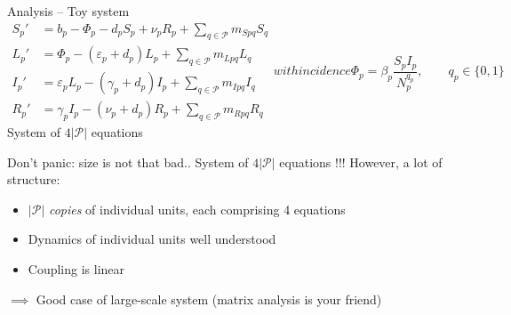 \documentclass[aspectratio=43]{beamer}
\begin{document}
\begin{frame}{Analysis -- Toy system}
\begin{subequations}
	\label{sys:pSLIRS_toy}
	\begin{align}
		S_{p}' &=b_p-\Phi_p-d_pS_p+\nu_pR_p
		+\textstyle{\sum_{q\in\mathcal{P}}} m_{Spq}S_{q} 
		\label{sys:pSLIRS_toy_dS} \\
		L_{p}' &=\Phi_p-\left( \varepsilon_{p}+d_{p}\right)L_{p}
		+\textstyle{\sum_{q\in\mathcal{P}}} m_{Lpq}L_{q} 
		\label{sys:pSLIRS_toy_dL} \\
		I_{p}' &=\varepsilon_pL_p-(\gamma_p+d_p)I_p
		+\textstyle{\sum_{q\in\mathcal{P}}} m_{Ipq}I_{q} 
		\label{sys:pSLIRS_toy_dI} \\
		R_{p}' &=\gamma _{p}I_{p}-\left(\nu_{p}+d_{p}\right)R_{p}
		+\textstyle{\sum_{q\in\mathcal{P}}} m_{Rpq}R_{q}
		\label{sys:pSLIRS_toy_dR} 
	\end{align}
	with incidence
	\begin{equation}
		\Phi_p=\beta_p\frac{S_pI_p}{N_p^{q_p}},\qquad q_p\in\{0,1\}
		\label{sys:pSLIRS_toy_incidence} 
	\end{equation}			
\end{subequations}
\vfill
System of $4|\mathcal{P}|$ equations
\end{frame}

\begin{frame}{Don't panic: size is not that bad..}
System of $4|\mathcal{P}|$ equations !!!
\vfill
However, a lot of structure: 
\begin{itemize}
	\item $|\mathcal{P}|$ \emph{copies} of individual units, each comprising 4 equations
	\item Dynamics of individual units well understood
	\item Coupling is linear
\end{itemize}
\vfill
$\implies$ Good case of large-scale system
\vfill
(matrix analysis is your friend)

\end{frame}



\end{document}
